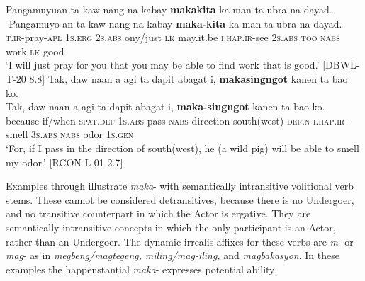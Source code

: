 \ea
\label{bkm:Ref392930212}
Pangamuyuan  ta  kaw  nang  na  kabay  \textbf{makakita} ka  man  ta  ubra  na  dayad. \\\smallskip
 \gll \emptyset{}-Pangamuyo-an  ta  kaw  nang  na  kabay  \textbf{maka-kita} ka  man  ta  ubra  na  dayad. \\
\textsc{t.ir}-pray-\textsc{apl}  1\textsc{s.erg}  2\textsc{s.abs}  ony/just  \textsc{lk} may.it.be \textsc{i.hap.ir}-see 2\textsc{s.abs} \textsc{too} \textsc{nabs}  work  \textsc{lk}  good \\
\glt `I will just pray for you that you may be able to find work that is good.’ [DBWL-T-20 8.8]
\z
\ea
\label{bkm:Ref120014811}
Tak, daw naan a agi ta dapit abagat i, \textbf{makasingngot} kanen ta bao ko. \\\smallskip
 \gll Tak, daw naan a agi ta dapit abagat i, \textbf{maka-singngot} kanen ta bao ko. \\
because  if/when  \textsc{spat.def} 1\textsc{s.abs}  pass  \textsc{nabs}  direction   south(west)  \textsc{def.n}\textsc{}
\textsc{i.hap.ir-}smell  3\textsc{s.abs}  \textsc{nabs}  odor  1\textsc{s.gen} \\
\glt `For, if I pass in the direction of south(west), he (a wild pig) will be able to smell my odor.’ [RCON-L-01 2.7]
\z

Examples  through  illustrate \textit{maka}{}- with semantically intransitive volitional verb stems. These cannot be considered detransitives, because there is no Undergoer, and no transitive counterpart in which the Actor is ergative. They are semantically intransitive concepts in which the only participant is an Actor, rather than an Undergoer. The dynamic irrealis affixes for these verbs are \textit{m}{}- or \textit{mag}{}- as in \textit{megbeng/magtegeng,} \textit{miling/mag-iling,} and \textit{magbakasyon}. In these examples the happenstantial \textit{maka}{}- expresses potential ability:

